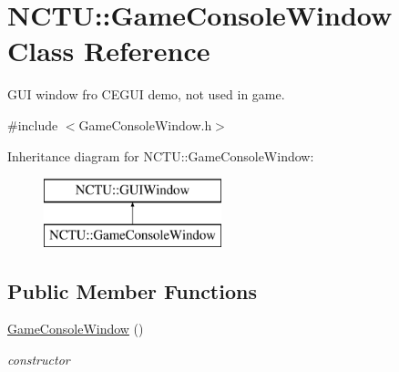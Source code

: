 \hypertarget{class_n_c_t_u_1_1_game_console_window}{}\section{N\+C\+TU\+:\+:Game\+Console\+Window Class Reference}
\label{class_n_c_t_u_1_1_game_console_window}


G\+UI window fro C\+E\+G\+UI demo, not used in game.  




{\ttfamily \#include $<$Game\+Console\+Window.\+h$>$}

Inheritance diagram for N\+C\+TU\+:\+:Game\+Console\+Window\+:\begin{figure}[H]
\begin{center}
\leavevmode
\includegraphics[height=2.000000cm]{class_n_c_t_u_1_1_game_console_window}
\end{center}
\end{figure}
\subsection*{Public Member Functions}
\begin{DoxyCompactItemize}
\item 
\hyperlink{class_n_c_t_u_1_1_game_console_window_a31f18fec374288dfab5e219ea03fe40f}{Game\+Console\+Window} ()\hypertarget{class_n_c_t_u_1_1_game_console_window_a31f18fec374288dfab5e219ea03fe40f}{}\label{class_n_c_t_u_1_1_game_console_window_a31f18fec374288dfab5e219ea03fe40f}

\begin{DoxyCompactList}\small\item\em constructor \end{DoxyCompactList}\end{DoxyCompactItemize}
